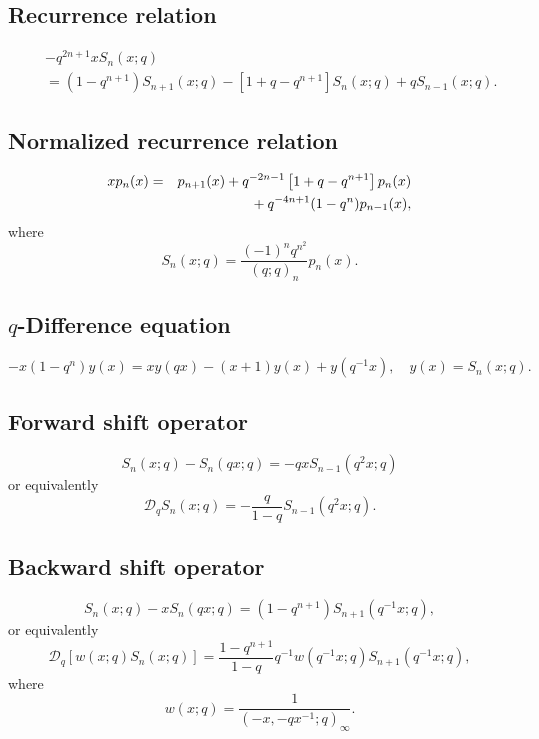 \documentclass[envcountchap,graybox]{svmono}
\newcommand{\mathindent}{\hspace{7.5mm}}
\begin{document}
{{\subsection*{Recurrence relation}
\begin{eqnarray}
\label{RecStieltjesWigert}
& &-q^{2n+1}xS_n(x;q)\nonumber\\
& &{}=(1-q^{n+1})S_{n+1}(x;q)-[1+q-q^{n+1}]S_n(x;q)+qS_{n-1}(x;q).
\end{eqnarray}

\subsection*{Normalized recurrence relation}
\begin{eqnarray}
\label{NormRecStieltjesWigert}
xp_n(x)&=&p_{n+1}(x)+q^{-2n-1}\left[1+q-q^{n+1}\right]p_n(x)\nonumber\\
& &{}\mathindent{}+q^{-4n+1}(1-q^n)p_{n-1}(x),
\end{eqnarray}
where
$$S_n(x;q)=\frac{(-1)^nq^{n^2}}{(q;q)_n}p_n(x).$$

\subsection*{$q$-Difference equation}
\begin{equation}
\label{dvStieltjesWigert}
-x(1-q^n)y(x)=xy(qx)-(x+1)y(x)+y(q^{-1}x),\quad y(x)=S_n(x;q).
\end{equation}

\newpage

\subsection*{Forward shift operator}
\begin{equation}
\label{shift1StieltjesWigertI}
S_n(x;q)-S_n(qx;q)=-qxS_{n-1}(q^2x;q)
\end{equation}
or equivalently
\begin{equation}
\label{shift1StieltjesWigertII}
\mathcal{D}_qS_n(x;q)=-\frac{q}{1-q}S_{n-1}(q^2x;q).
\end{equation}

\subsection*{Backward shift operator}
\begin{equation}
\label{shift2StieltjesWigertI}
S_n(x;q)-xS_n(qx;q)=(1-q^{n+1})S_{n+1}(q^{-1}x;q),
\end{equation}
or equivalently
\begin{equation}
\label{shift2StieltjesWigertII}
\mathcal{D}_q\left[w(x;q)S_n(x;q)\right]=\frac{1-q^{n+1}}{1-q}q^{-1}w(q^{-1}x;q)S_{n+1}(q^{-1}x;q),
\end{equation}
where
$$w(x;q)=\frac{1}{(-x,-qx^{-1};q)_{\infty}}.$$

}}
\end{document}
